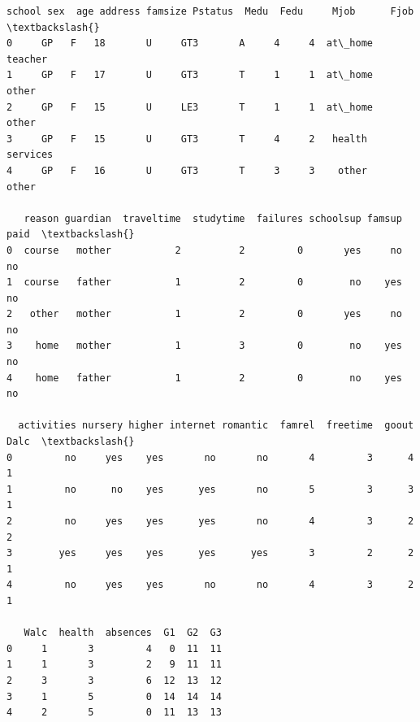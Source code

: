 \documentclass[9pt]{article}
\begin{document}
    
    \begin{Verbatim}[commandchars=\\\{\}]
  school sex  age address famsize Pstatus  Medu  Fedu     Mjob      Fjob  \textbackslash{}
0     GP   F   18       U     GT3       A     4     4  at\_home   teacher   
1     GP   F   17       U     GT3       T     1     1  at\_home     other   
2     GP   F   15       U     LE3       T     1     1  at\_home     other   
3     GP   F   15       U     GT3       T     4     2   health  services   
4     GP   F   16       U     GT3       T     3     3    other     other   

   reason guardian  traveltime  studytime  failures schoolsup famsup paid  \textbackslash{}
0  course   mother           2          2         0       yes     no   no   
1  course   father           1          2         0        no    yes   no   
2   other   mother           1          2         0       yes     no   no   
3    home   mother           1          3         0        no    yes   no   
4    home   father           1          2         0        no    yes   no   

  activities nursery higher internet romantic  famrel  freetime  goout  Dalc  \textbackslash{}
0         no     yes    yes       no       no       4         3      4     1   
1         no      no    yes      yes       no       5         3      3     1   
2         no     yes    yes      yes       no       4         3      2     2   
3        yes     yes    yes      yes      yes       3         2      2     1   
4         no     yes    yes       no       no       4         3      2     1   

   Walc  health  absences  G1  G2  G3  
0     1       3         4   0  11  11  
1     1       3         2   9  11  11  
2     3       3         6  12  13  12  
3     1       5         0  14  14  14  
4     2       5         0  11  13  13  
    \end{Verbatim}

    
    
\end{document}
